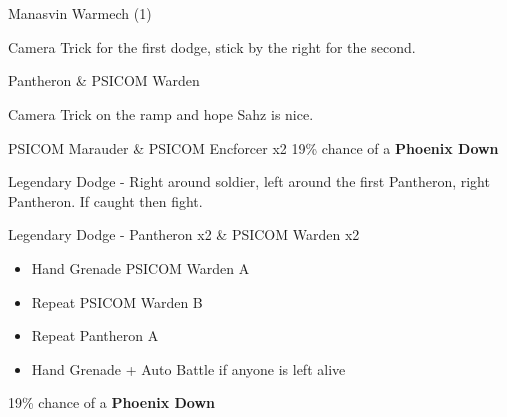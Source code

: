 \documentclass{report}
\begin{document}
\newcommand{\paradigmdeckfour}[5]{\begin{tabular}{ c | c | c } #1 \\ \hline #2 \\ #3 \\ #4 \\ #5 \\  \end{tabular}}

\newcommand{\paradigmdeckfive}[6]{\begin{tabular}{ c | c | c } #1 \\ \hline #2 \\ #3 \\ #4 \\ #5 \\ #6 \\ \end{tabular}}

\newcommand{\save}[1]{Save prompt after cut-scene \##1}

\newcommand{\pickup}[2]{Pick up the \textbf{#1} located #2.}

\newcommand{\itemdrop}[2]{#1\% chance of a \textbf{#2}}

\newcommand{\decep}[2]{\textbf{Deceptisol} on the #1, cancel on the #2.}

\chapter{}

\begin{battle}{Manasvin Warmech (1)}
\end{battle}

Camera Trick for the first dodge, stick by the right for the second.

\begin{battle}{Pantheron \& PSICOM Warden}
\end{battle}

Camera Trick on the ramp and hope Sahz is nice.

\begin{battle}{PSICOM Marauder \& PSICOM Encforcer x2}
\itemdrop{19}{Phoenix Down}
\end{battle}

Legendary Dodge - Right around soldier, left around the first Pantheron, right Pantheron. If caught then fight.

\begin{battle}{Legendary Dodge - Pantheron x2 \& PSICOM Warden x2}
\begin{itemize}
    \item Hand Grenade PSICOM Warden A
    \item Repeat PSICOM Warden B
    \item Repeat Pantheron A
    \item Hand Grenade + Auto Battle if anyone is left alive
\end{itemize}

\itemdrop{19}{Phoenix Down}
\end{battle}
\end{document}
